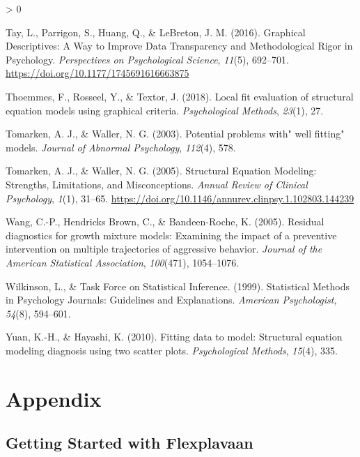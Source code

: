 \documentclass[
  english,
  man]{apa6}
\newlength{\cslhangindent}
\newenvironment{CSLReferences}[2] %
 {%
  \setlength{\parindent}{0pt}
  \ifodd #1 \everypar{\setlength{\hangindent}{\cslhangindent}}\ignorespaces\fi
  \ifnum #2 > 0
  \setlength{\parskip}{#2\baselineskip}
  \fi
 }%
 {}
\begin{document}
\begin{CSLReferences}{1}{0}
\leavevmode\hypertarget{ref-Tay2016a}{}%
Tay, L., Parrigon, S., Huang, Q., \& LeBreton, J. M. (2016). {Graphical Descriptives: A Way to Improve Data Transparency and Methodological Rigor in Psychology}. \emph{Perspectives on Psychological Science}, \emph{11}(5), 692--701. \url{https://doi.org/10.1177/1745691616663875}

\leavevmode\hypertarget{ref-thoemmes2018local}{}%
Thoemmes, F., Rosseel, Y., \& Textor, J. (2018). Local fit evaluation of structural equation models using graphical criteria. \emph{Psychological Methods}, \emph{23}(1), 27.

\leavevmode\hypertarget{ref-tomarken2003potential}{}%
Tomarken, A. J., \& Waller, N. G. (2003). Potential problems with" well fitting" models. \emph{Journal of Abnormal Psychology}, \emph{112}(4), 578.

\leavevmode\hypertarget{ref-Tomarken2005}{}%
Tomarken, A. J., \& Waller, N. G. (2005). {Structural Equation Modeling: Strengths, Limitations, and Misconceptions}. \emph{Annual Review of Clinical Psychology}, \emph{1}(1), 31--65. \url{https://doi.org/10.1146/annurev.clinpsy.1.102803.144239}

\leavevmode\hypertarget{ref-wang2005residual}{}%
Wang, C.-P., Hendricks Brown, C., \& Bandeen-Roche, K. (2005). Residual diagnostics for growth mixture models: Examining the impact of a preventive intervention on multiple trajectories of aggressive behavior. \emph{Journal of the American Statistical Association}, \emph{100}(471), 1054--1076.

\leavevmode\hypertarget{ref-Wilkinson1999a}{}%
Wilkinson, L., \& Task Force on Statistical Inference. (1999). {Statistical Methods in Psychology Journals: Guidelines and Explanations}. \emph{American Psychologist}, \emph{54}(8), 594--601.

\leavevmode\hypertarget{ref-yuan2010fitting}{}%
Yuan, K.-H., \& Hayashi, K. (2010). Fitting data to model: Structural equation modeling diagnosis using two scatter plots. \emph{Psychological Methods}, \emph{15}(4), 335.

\end{CSLReferences}

\pagebreak

\hypertarget{appendix}{%
\section{Appendix}\label{appendix}}

\hypertarget{getting-started-with-flexplavaan}{%
\subsection{Getting Started with Flexplavaan}\label{getting-started-with-flexplavaan}}
\end{document}
